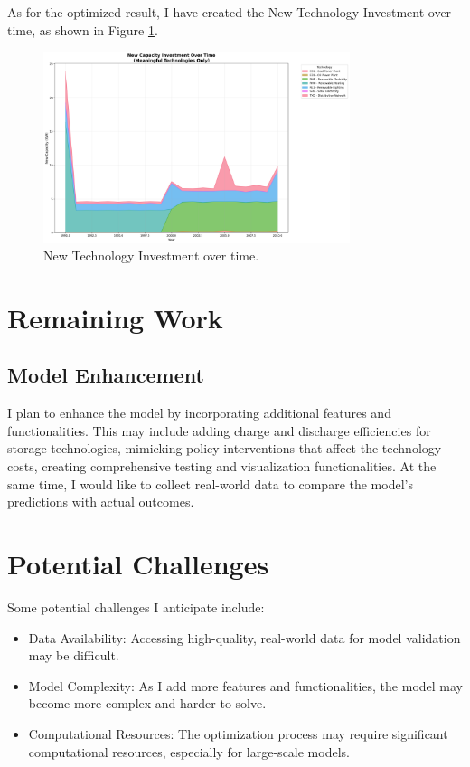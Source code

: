 \documentclass[11pt]{article}
\begin{document}
As for the optimized result, I have created the New Technology Investment over time, as shown in Figure \ref{fig:new_technology_investment}.
\begin{figure}[H]
    \centering
    \includegraphics[width=0.8\textwidth]{meaningful_technology_capacity_labeled.png}
    \caption{New Technology Investment over time.}
    \label{fig:new_technology_investment}
\end{figure}    

\section{Remaining Work}
\subsection{Model Enhancement}
I plan to enhance the model by incorporating additional features and functionalities. This may include adding charge and discharge efficiencies for storage technologies, mimicking policy interventions that affect the technology costs, creating comprehensive testing and visualization functionalities. At the same time, I would like to collect real-world data to compare the model's predictions with actual outcomes.

\section{Potential Challenges}
Some potential challenges I anticipate include:
\begin{itemize}
    \item Data Availability: Accessing high-quality, real-world data for model validation may be difficult.
    \item Model Complexity: As I add more features and functionalities, the model may become more complex and harder to solve.
    \item Computational Resources: The optimization process may require significant computational resources, especially for large-scale models.
\end{itemize}




\end{document}
